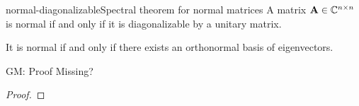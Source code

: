\begin{Theorem*}{normal-diagonalizable}{Spectral theorem for normal matrices}
  A matrix $\mathbf A\in\mathbb C^{n\times n}$ is normal if and only if it is diagonalizable by a unitary matrix.

  It is normal if and only if there exists an orthonormal basis of eigenvectors.
\end{Theorem*}

\begin{todo}
  GM: Proof Missing?
\end{todo}
\begin{proof}

\end{proof}



